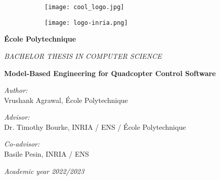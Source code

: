 \documentclass[10pt, a4paper]{article}
\newcommand{\thesistitle}[0]{Model-Based Engineering for Quadcopter Control Software}
\newcommand{\authorname}[0]{Vrushank Agrawal}
\newcommand{\supervisor}[0]{Dr. Timothy Bourke}
\newcommand{\supervisorinstitution}[0]{INRIA / ENS / \'Ecole Polytechnique}
\begin{document}
\clearpage
\setcounter{figure}{0}

\begin{titlepage}
\begin{center}

    \begin{figure}
        \centering
        \begin{subfigure}[b]{0.35\textwidth}
            \centering
            \texttt{[image: cool\_logo.jpg]}
            \label{figure:Polytechnique}
        \end{subfigure}
        \begin{subfigure}[b]{0.35\textwidth}
            \centering
            \texttt{[image: logo-inria.png]}
            \label{figure:Polytechnique}
        \end{subfigure}
        \label{figure:Cool Logos}
    \end{figure}

    \vspace*{2em}
    
    {\Large
        \textbf{\'Ecole Polytechnique}
        
        \vspace*{1em}
        \textit{BACHELOR THESIS IN COMPUTER SCIENCE}
        
        \vspace*{3em}
        {\huge {} \textbf{\thesistitle} \par}
    
        \vspace*{3em}
        
        \textit{Author:}\\
        \vspace*{0.5em}
        \authorname{}, \'Ecole Polytechnique
        
        \vspace*{0.5em}
        
        \textit{Advisor:}\\
        \vspace*{0.5em}
        \supervisor{}, \supervisorinstitution{}
        
        \vspace*{0.5em}
        
        \textit{Co-advisor:}\\
        \vspace*{0.5em}
        Basile Pesin, INRIA / ENS
    }
    
    \vspace*{15em}
    \textit{Academic year 2022/2023}

\end{center}
\end{titlepage}
\end{document}
